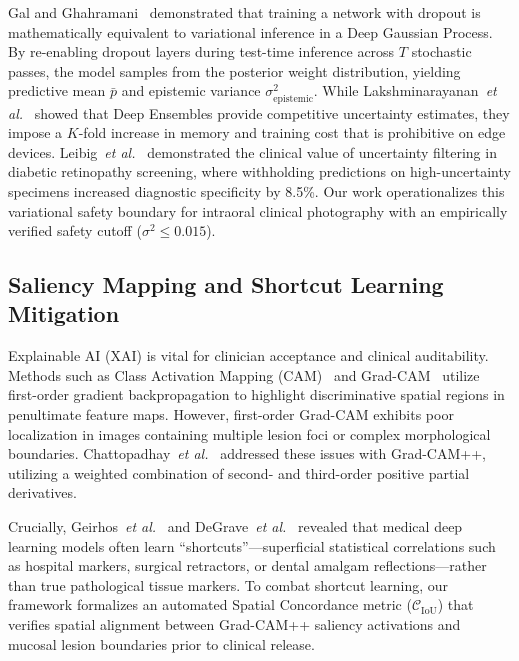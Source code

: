 \documentclass[journal]{IEEEtran}
\begin{document}
Gal and Ghahramani~\cite{gal2016dropout} demonstrated that training a network with dropout is mathematically equivalent to variational inference in a Deep Gaussian Process. By re-enabling dropout layers during test-time inference across $T$ stochastic passes, the model samples from the posterior weight distribution, yielding predictive mean $\bar{p}$ and epistemic variance $\sigma^2_{\text{epistemic}}$. While Lakshminarayanan~\textit{et al.}~\cite{lakshminarayanan2017deep} showed that Deep Ensembles provide competitive uncertainty estimates, they impose a $K$-fold increase in memory and training cost that is prohibitive on edge devices. Leibig~\textit{et al.}~\cite{leibig2017leveraging} demonstrated the clinical value of uncertainty filtering in diabetic retinopathy screening, where withholding predictions on high-uncertainty specimens increased diagnostic specificity by 8.5\%. Our work operationalizes this variational safety boundary for intraoral clinical photography with an empirically verified safety cutoff ($\sigma^2 \le 0.015$).

\subsection{Saliency Mapping and Shortcut Learning Mitigation}
Explainable AI (XAI) is vital for clinician acceptance and clinical auditability. Methods such as Class Activation Mapping (CAM)~\cite{zhou2016learning} and Grad-CAM~\cite{selvaraju2017grad} utilize first-order gradient backpropagation to highlight discriminative spatial regions in penultimate feature maps. However, first-order Grad-CAM exhibits poor localization in images containing multiple lesion foci or complex morphological boundaries. Chattopadhay~\textit{et al.}~\cite{chattopadhay2018grad} addressed these issues with Grad-CAM++, utilizing a weighted combination of second- and third-order positive partial derivatives.

Crucially, Geirhos~\textit{et al.}~\cite{geirhos2020shortcut} and DeGrave~\textit{et al.}~\cite{degrave2021shortcut} revealed that medical deep learning models often learn ``shortcuts''---superficial statistical correlations such as hospital markers, surgical retractors, or dental amalgam reflections---rather than true pathological tissue markers. To combat shortcut learning, our framework formalizes an automated Spatial Concordance metric ($\mathcal{C}_{\text{IoU}}$) that verifies spatial alignment between Grad-CAM++ saliency activations and mucosal lesion boundaries prior to clinical release.
\end{document}
